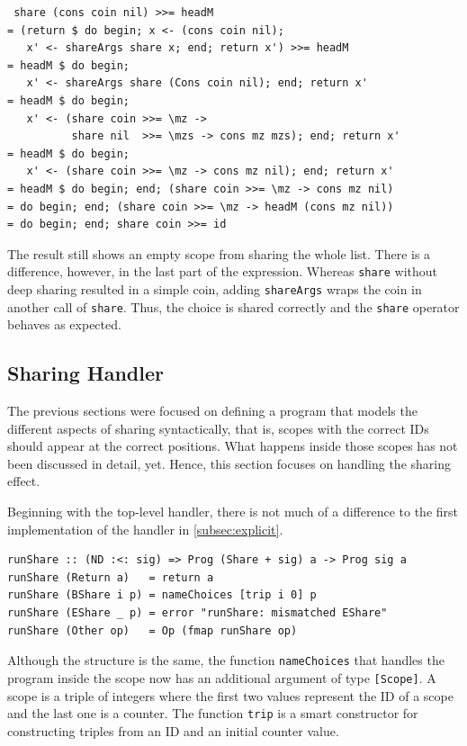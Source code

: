 \documentclass[a4paper, 11pt, fleqn, twoside, abstract=on]{scrreprt}
\newcommand{\hinl}[1]{\texttt{#1}}
\begin{document}
\begin{verbatim}
 share (cons coin nil) >>= headM
= (return $ do begin; x <- (cons coin nil); 
   x' <- shareArgs share x; end; return x') >>= headM
= headM $ do begin; 
   x' <- shareArgs share (Cons coin nil); end; return x'
= headM $ do begin; 
   x' <- (share coin >>= \mz -> 
          share nil  >>= \mzs -> cons mz mzs); end; return x'
= headM $ do begin; 
   x' <- (share coin >>= \mz -> cons mz nil); end; return x'
= headM $ do begin; end; (share coin >>= \mz -> cons mz nil)
= do begin; end; (share coin >>= \mz -> headM (cons mz nil))
= do begin; end; share coin >>= id
\end{verbatim}

The result still shows an empty scope from sharing the whole list.
There is a difference, however, in the last part of the expression.
Whereas \hinl{share} without deep sharing resulted in a simple coin, adding \hinl{shareArgs} wraps the coin in another call of \hinl{share}.
Thus, the choice is shared correctly and the \hinl{share} operator behaves as expected.

\subsection{Sharing Handler}
The previous sections were focused on defining a program that models the different aspects of sharing syntactically, that is, scopes with the correct IDs should appear at the correct positions.
What happens inside those scopes has not been discussed in detail, yet.
Hence, this section focuses on handling the sharing effect.

Beginning with the top-level handler, there is not much of a difference to the first implementation of the handler in \autoref{subsec:explicit}.

\begin{verbatim}
runShare :: (ND :<: sig) => Prog (Share + sig) a -> Prog sig a
runShare (Return a)   = return a
runShare (BShare i p) = nameChoices [trip i 0] p
runShare (EShare _ p) = error "runShare: mismatched EShare"
runShare (Other op)   = Op (fmap runShare op)
\end{verbatim}
\noindent
Although the structure is the same, the function \hinl{nameChoices} that handles the program inside the scope now has an additional argument of type \hinl{[Scope]}.
A scope is a triple of integers where the first two values represent the ID of a scope and the last one is a counter.
The function \hinl{trip} is a smart constructor for constructing triples from an ID and an initial counter value.
\end{document}

